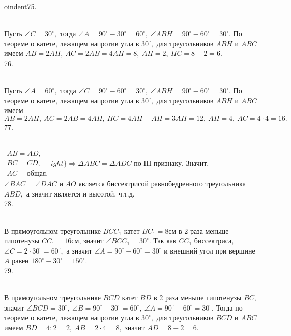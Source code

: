 oindent75. \begin{figure}[ht!]
\end{figure}\\
Пусть $\angle C=30^\circ,$ тогда $\angle A=90^\circ-30^\circ=60^\circ,\ \angle ABH=90^\circ-60^\circ=30^\circ.$ По теореме о катете, лежащем напротив угла в $30^\circ,$ для треугольников $ABH$ и $ABC$ имеем $AB=2AH,\ AC=2AB=4AH=8,\ AH=2,\ HC=8-2=6.$\\
76. \begin{figure}[ht!]
\end{figure}\\
Пусть $\angle A=60^\circ,$ тогда $\angle C=90^\circ-60^\circ=30^\circ,\ \angle ABH=90^\circ-60^\circ=30^\circ.$ По теореме о катете, лежащем напротив угла в $30^\circ,$ для треугольников $ABH$ и $ABC$ имеем $AB=2AH,\ AC=2AB=4AH,\ HC=4AH-AH=3AH=12,\ AH=4,\ AC=4\cdot4=16.$\\
77. \begin{figure}[ht!]
\end{figure}\\
$\left.\begin{array}{l}AB=AD,\\
BC=CD,\\
AC\text{--- общая.}  \end{array}
ight\}\Rightarrow \Delta ABC=\Delta ADC\text{ по III признаку.}$ Значит, $\angle BAC=\angle DAC$ и $AO$ является биссектрисой равнобедренного треугольника $ABD,$ а значит является и высотой, ч.т.д.\\
78. \begin{figure}[ht!]
\end{figure}\\
В прямоугольном треугольнике $BCC_1$ катет $BC_1=8$см в 2 раза меньше гипотенузы $CC_1=16$см, значит $\angle BCC_1=30^\circ.$ Так как $CC_1$ биссектриса, $\angle C=2\cdot30^\circ=60^\circ,$ а значит $\angle A=90^\circ-60^\circ=30^\circ$ и внешний угол при вершине $A$ равен $180^\circ-30^\circ=150^\circ.$\\
79. \begin{figure}[ht!]
\end{figure}\\
В прямоугольном треугольнике $BCD$ катет $BD$ в 2 раза меньше гипотенузы $BC,$ значит $\angle BCD=30^\circ,\ \angle B=90^\circ-30^\circ=60^\circ,\ \angle A=90^\circ-60^\circ=30^\circ.$ Тогда по теореме о катете, лежащем напротив угла в $30^\circ,$ для треугольников $BCD$ и $ABC$ имеем $BD=4:2=2,\ AB=2\cdot4=8,$ значит  $AD=8-2=6.$\\
